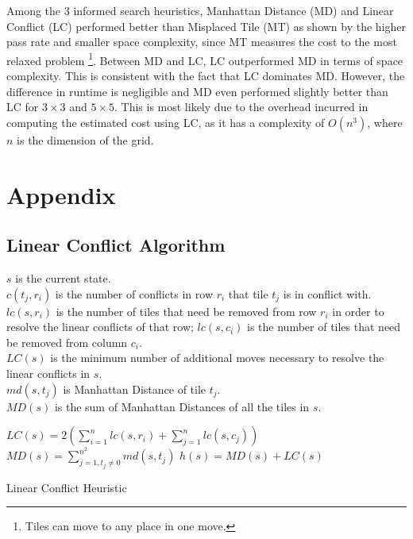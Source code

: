 \documentclass{llncs}
\begin{document}
Among the 3 informed search heuristics, Manhattan Distance (MD) and Linear Conflict (LC) performed better than Misplaced Tile (MT) as shown by the higher pass rate and smaller space complexity, since MT measures the cost to the most relaxed problem \footnote{Tiles can move to any place in one move.}. Between MD and LC, LC outperformed MD in terms of space complexity. This is consistent with the fact that LC dominates MD. However, the difference in runtime is negligible and MD even performed slightly better than LC for $3 \times 3$ and $5 \times 5$. This is most likely due to the overhead incurred in computing the estimated cost using LC, as it has a complexity of $O(n^3)$, where $n$ is the dimension of the grid.

\newpage




\newpage
\section{Appendix}

\subsection{Linear Conflict Algorithm}
\begin{definition}$ $\\
	$s$ is the current state.\\
	$c(t_j,r_i)$ is the number of conflicts in row $r_i$ that tile $t_j$ is in conflict with.\\
	$lc(s, r_i)$ is the number of tiles that need be removed from row $r_i$ in order to resolve the linear conflicts of that row; $lc(s, c_i)$ is the number of tiles that need be removed from column $c_i$.\\
	$LC(s)$ is the minimum number of additional moves necessary to resolve the linear conflicts in $s$.\\
	$md(s, t_j)$ is Manhattan Distance of tile $t_j$.\\
	$MD(s)$ is the sum of Manhattan Distances of all the tiles in $s$.
\end{definition}

\begin{algorithm}[H]


	$LC(s) = 2(\sum^n_{i=1} lc(s,r_i) + \sum^n_{j=1} lc(s,c_j))$\;
	$MD(s) = \sum^{n^2}_{j=1, t_j \neq 0}md(s,t_j)$\;
	$h(s) = MD(s) + LC(s)$\;
	\caption{Linear Conflict Heuristic}
\end{algorithm}
\end{document}
